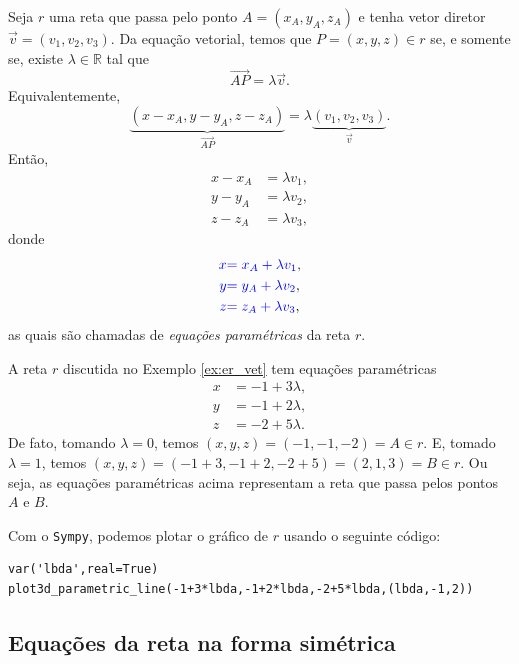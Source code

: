 Seja $r$ uma reta que passa pelo ponto $A = (x_A,y_A,z_A)$ e tenha vetor diretor $\vec{v} = (v_1,v_2,v_3)$. Da equação vetorial, temos que $P = (x,y,z)\in r$ se, e somente se, existe $\lambda\in\mathbb{R}$ tal que
\begin{equation}
  \overrightarrow{AP} = \lambda\vec{v}.
\end{equation}
Equivalentemente,
\begin{equation}
  \underbrace{(x-x_A,y-y_A,z-z_A)}_{\overrightarrow{AP}} = \lambda \underbrace{(v_1,v_2,v_3)}_{\vec{v}}.
\end{equation}
Então,
\begin{align}
  x-x_A &= \lambda v_1,\\
  y-y_A &= \lambda v_2,\\
  z-z_A &= \lambda v_3,
\end{align}
donde
\begin{align}
  {\color{blue}x} &{\color{blue}= x_A + \lambda v_1},\\
  {\color{blue}y} &{\color{blue}= y_A + \lambda v_2},\\
  {\color{blue}z} &{\color{blue}= z_A + \lambda v_3},
\end{align}
as quais são chamadas de \emph{equações paramétricas} da reta $r$.

\begin{ex}\label{ex:ex_er_par}
  A reta $r$ discutida no Exemplo \ref{ex:er_vet} tem equações paramétricas
  \begin{align}
    x &= -1 + 3\lambda,\\
    y &= -1 + 2\lambda,\\
    z &= -2 + 5\lambda.
  \end{align}
  De fato, tomando $\lambda = 0$, temos $(x,y,z) = (-1,-1,-2) = A\in r$. E, tomado $\lambda = 1$, temos $(x,y,z) = (-1+3,-1+2,-2+5) = (2,1,3) = B\in r$. Ou seja, as equações paramétricas acima representam a reta que passa pelos pontos $A$ e $B$.

  \ifispython
  Com o \verb+Sympy+, podemos plotar o gráfico de $r$ usando o seguinte código:
\begin{verbatim}
var('lbda',real=True)
plot3d_parametric_line(-1+3*lbda,-1+2*lbda,-2+5*lbda,(lbda,-1,2))
\end{verbatim}
  \fi
\end{ex}

\subsection{Equações da reta na forma simétrica}

